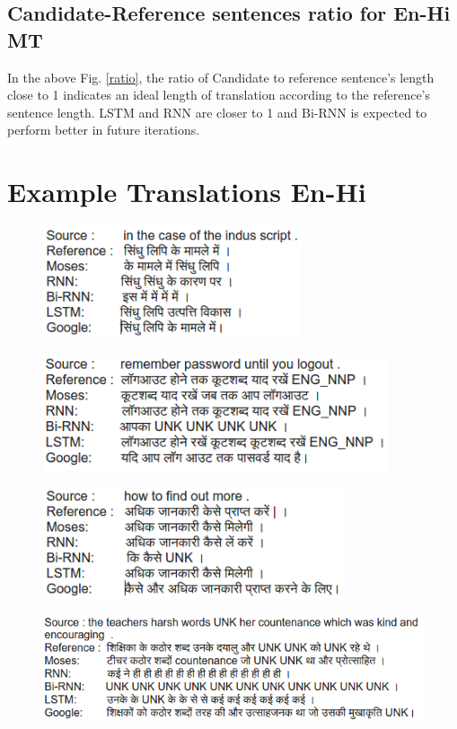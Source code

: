 \documentclass[12pt]{report}
\begin{document}
\subsection{Candidate-Reference sentences ratio for En-Hi MT}
In the above Fig. \ref{ratio}, the ratio of Candidate to reference sentence's length close to 1 indicates an ideal length of translation according to the reference's sentence length.
LSTM and RNN are closer to 1 and Bi-RNN is expected to perform better in future iterations.


\section{Example Translations En-Hi}\label{sec_int}

\begin{figure}[!hbt]
\includegraphics[width=3in]{t1.png}%
\end{figure}

\begin{figure}[!hbt]
\includegraphics[width=4in]{t2.png}%
\end{figure}

\begin{figure}[!hbt]
\includegraphics[width=3.5in]{t3.png}%
\end{figure}

\begin{figure}[!hbt]
\includegraphics[width=5in]{t4.png}%
\end{figure}
\end{document}
